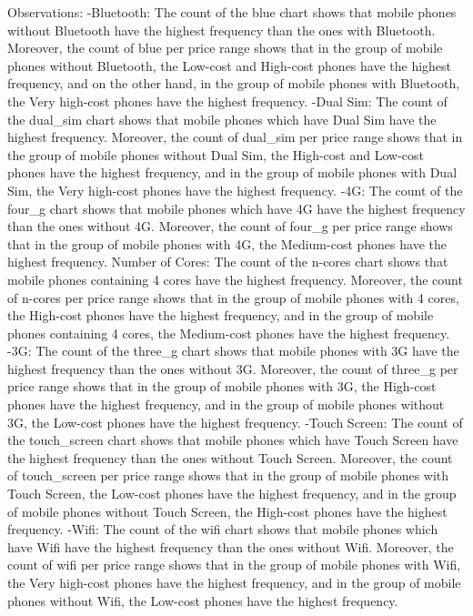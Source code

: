 \documentclass[
]{article}
\begin{document}
Observations: -Bluetooth: The count of the blue chart shows that mobile
phones without Bluetooth have the highest frequency than the ones with
Bluetooth. Moreover, the count of blue per price range shows that in the
group of mobile phones without Bluetooth, the Low-cost and High-cost
phones have the highest frequency, and on the other hand, in the group
of mobile phones with Bluetooth, the Very high-cost phones have the
highest frequency. -Dual Sim: The count of the dual\_sim chart shows
that mobile phones which have Dual Sim have the highest frequency.
Moreover, the count of dual\_sim per price range shows that in the group
of mobile phones without Dual Sim, the High-cost and Low-cost phones
have the highest frequency, and in the group of mobile phones with Dual
Sim, the Very high-cost phones have the highest frequency. -4G: The
count of the four\_g chart shows that mobile phones which have 4G have
the highest frequency than the ones without 4G. Moreover, the count of
four\_g per price range shows that in the group of mobile phones with
4G, the Medium-cost phones have the highest frequency. Number of Cores:
The count of the n-cores chart shows that mobile phones containing 4
cores have the highest frequency. Moreover, the count of n-cores per
price range shows that in the group of mobile phones with 4 cores, the
High-cost phones have the highest frequency, and in the group of mobile
phones containing 4 cores, the Medium-cost phones have the highest
frequency. -3G: The count of the three\_g chart shows that mobile phones
with 3G have the highest frequency than the ones without 3G. Moreover,
the count of three\_g per price range shows that in the group of mobile
phones with 3G, the High-cost phones have the highest frequency, and in
the group of mobile phones without 3G, the Low-cost phones have the
highest frequency. -Touch Screen: The count of the touch\_screen chart
shows that mobile phones which have Touch Screen have the highest
frequency than the ones without Touch Screen. Moreover, the count of
touch\_screen per price range shows that in the group of mobile phones
with Touch Screen, the Low-cost phones have the highest frequency, and
in the group of mobile phones without Touch Screen, the High-cost phones
have the highest frequency. -Wifi: The count of the wifi chart shows
that mobile phones which have Wifi have the highest frequency than the
ones without Wifi. Moreover, the count of wifi per price range shows
that in the group of mobile phones with Wifi, the Very high-cost phones
have the highest frequency, and in the group of mobile phones without
Wifi, the Low-cost phones have the highest frequency.
\end{document}
